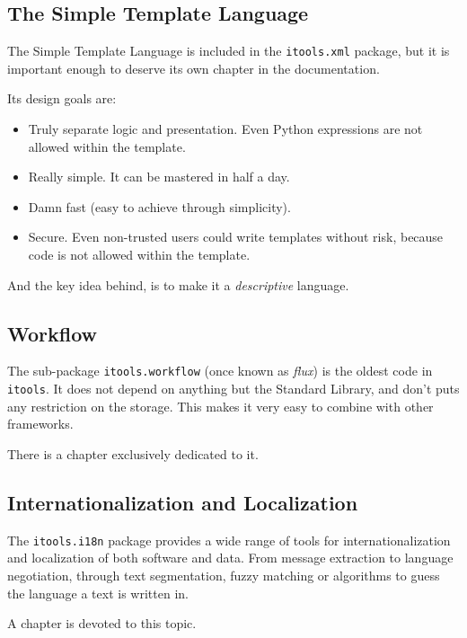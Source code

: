 \subsection{The Simple Template Language}

The Simple Template Language is included in the {\tt itools.xml} package,
but it is important enough to deserve its own chapter in the documentation.

Its design goals are:

\begin{itemize}
  \item Truly separate logic and presentation. Even Python expressions are
    not allowed within the template.

  \item Really simple. It can be mastered in half a day.

  \item Damn fast (easy to achieve through simplicity).

  \item Secure. Even non-trusted users could write templates without risk,
    because code is not allowed within the template.
\end{itemize}

And the key idea behind, is to make it a {\em descriptive} language.


\subsection{Workflow}

The sub-package {\tt itools.workflow} (once known as {\em flux}) is the
oldest code in {\tt itools}. It does not depend on anything but the
Standard Library, and don't puts any restriction on the storage. This
makes it very easy to combine with other frameworks.

There is a chapter exclusively dedicated to it.

\subsection{Internationalization and Localization}

The {\tt itools.i18n} package provides a wide range of tools for
internationalization and localization of both software and data. From
message extraction to language negotiation, through text segmentation,
fuzzy matching or algorithms to guess the language a text is written in.

A chapter is devoted to this topic.


